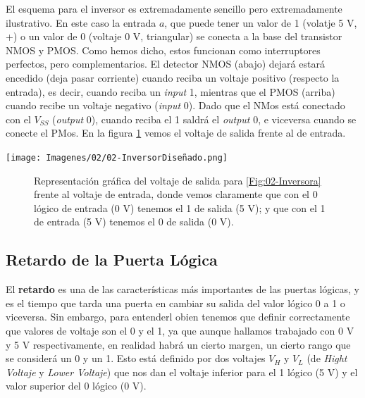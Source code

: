 \begin{minipage}{0.65\linewidth}
El esquema para el inversor es extremadamente sencillo pero extremadamente ilustrativo. En este caso la entrada $a$, que puede tener un valor de 1 (volatje 5 V, +) o un valor de 0 (voltaje 0 V, triangular) se conecta a la base del transistor NMOS y PMOS. Como hemos dicho, estos funcionan como interruptores perfectos, pero complementarios. El detector NMOS (abajo) dejará estará encedido (deja pasar corriente) cuando reciba un voltaje positivo (respecto la entrada), es decir, cuando reciba un \textit{input} 1, mientras que el PMOS (arriba) cuando recibe un voltaje negativo (\textit{input} 0). Dado que el NMos está conectado con el $V_{SS}$ (\textit{output} 0), cuando reciba el 1 saldrá el \textit{output} 0, e viceversa cuando se conecte el PMos. En la figura \cref{Fig:02-InversorV} vemos el voltaje de salida frente al de entrada.
\end{minipage}
\hfill
\begin{minipage}{0.32\linewidth} \centering
    \texttt{[image: Imagenes/02/02-InversorDiseñado.png]}
    \label{Fig:02-Inversora}
\end{minipage}


\begin{figure}[H] \centering
{}
\caption{Representación gráfica del voltaje de salida para \cref{Fig:02-Inversora} frente al voltaje de entrada, donde vemos claramente que con el 0 lógico de entrada (0 V) tenemos el 1 de salida (5 V); y que con el 1 de entrada (5 V) tenemos el 0 de salida (0 V).}
\label{Fig:02-InversorV}
\end{figure}




\subsection{Retardo de la Puerta Lógica}

El \textbf{retardo} es una de las características más importantes de las puertas lógicas, y es el tiempo que tarda una puerta en cambiar su salida del valor lógico 0 a 1 o viceversa. Sin embargo, para entenderl obien tenemos que definir correctamente que valores de voltaje son el 0 y el 1, ya que aunque hallamos trabajado con 0 V y 5 V respectivamente, en realidad habrá un cierto margen, un cierto rango que se considerá un 0 y un 1. Esto está definido por dos voltajes $V_H$ y $V_L$ (de \textit{Hight Voltaje} y \textit{Lower Voltaje}) que nos dan el voltaje inferior para el 1 lógico (5 V) y el valor superior del 0 lógico (0 V).

